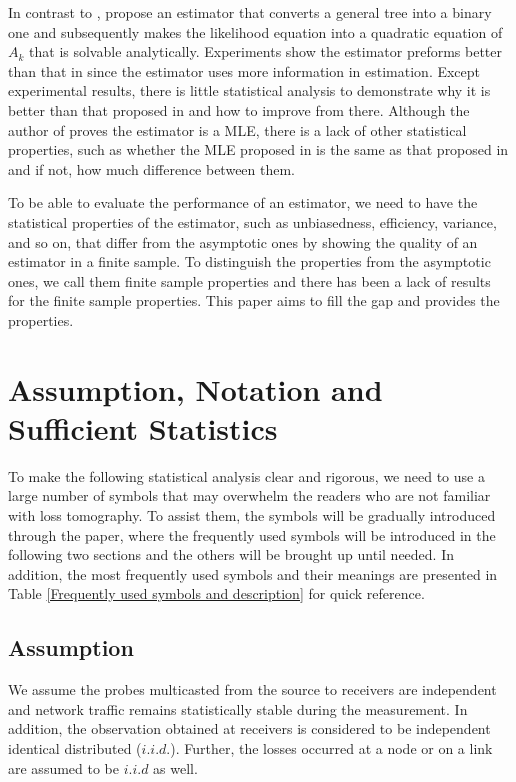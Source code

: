 \documentclass[10pt,onecolumn]{IEEEtran}
\begin{document}
In contrast to \cite{DHPT06}, \cite{ADV07, Zhu11a} propose an estimator that converts a general tree into a binary one and subsequently makes the likelihood equation into a quadratic equation of $A_k$  that is solvable analytically.   Experiments show the estimator preforms better than that in \cite{DHPT06} since the estimator uses more information in estimation.  Except experimental results, there is little statistical analysis to demonstrate why it is better than that proposed in \cite{DHPT06} and how to improve from there. Although the author of \cite{Zhu11a} proves the estimator is a MLE, there is a lack of other statistical properties, such as whether the MLE proposed in \cite{Zhu11a} is the same as that proposed in \cite{CDHT99} and if not, how much difference between them.

To be able to evaluate the performance of an estimator, we need to have the statistical properties of the estimator, such as unbiasedness, efficiency, variance, and so on, that differ from the asymptotic ones by showing the quality of an estimator in a finite sample. To distinguish the properties from the asymptotic ones, we call them finite sample properties and there has been a lack of results for the finite sample properties.  This paper aims to fill the gap and provides the properties.

\section{Assumption, Notation and Sufficient Statistics} \label{section2}

 To make the following statistical analysis clear and rigorous, we need to use  a large number of symbols that may overwhelm the readers who are not familiar with loss tomography. To assist them, the symbols  will be gradually introduced through the paper, where the frequently used symbols will be introduced in the following two sections and the others will be brought up  until needed. In addition, the most frequently used symbols and their meanings are presented in Table \ref{Frequently used symbols and description} for quick reference.


\subsection{Assumption}
We assume the probes multicasted from the source to receivers are
independent and network traffic remains statistically stable during the measurement. In addition, the observation obtained at receivers  is considered to be independent identical distributed
($i.i.d.$). Further, the losses occurred at a node or on a link are assumed to be $i.i.d$  as well.
\end{document}

